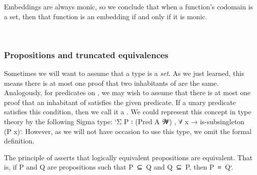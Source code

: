 Embeddings are always monic, so we conclude that when a function's codomain is a set, then that function is an embedding if and only if it is monic.
\ccpad
\begin{code}%
\>[0][@{}l@{\AgdaIndent{1}}]%
\>[1]\AgdaSpace{}%
\AgdaSymbol{:}%
\>[234I]\AgdaSymbol{(}\AgdaSpace{}%
\AgdaSymbol{:}\AgdaSpace{}%
\AgdaSpace{}%
\AgdaSpace{}%
\AgdaSymbol{)}\AgdaSpace{}%
\AgdaSpace{}%
\AgdaSpace{}%
\AgdaSpace{}%
\AgdaSpace{}%
\AgdaSpace{}%
\AgdaSpace{}%
\AgdaSpace{}%
\AgdaSpace{}%
\<%
\\
\>[1]\AgdaSpace{}%
\AgdaSpace{}%
\AgdaSpace{}%
\AgdaSymbol{=}\AgdaSpace{}%
\AgdaSymbol{(}\AgdaSpace{}%
\AgdaSymbol{)}\AgdaOperator{\AgdaInductiveConstructor{,}}\AgdaSpace{}%
\AgdaSymbol{(}\AgdaSpace{}%
\AgdaSpace{}%
\AgdaSymbol{)}\<%
\end{code}

\newcommand\proptype{\href{https://agda.readthedocs.io/en/v2.6.1.3/language/prop.html}{\af{Prop}}\xspace}

\subsubsection{Propositions and truncated equivalences}\label{propositions}

Sometimes we will want to assume that a type  is a \emph{set}. As we just learned, this means there is at most one proof that two inhabitants of  are the same. Analogously, for predicates on , we may wish to assume that there is at most one proof that an inhabitant of  satisfies the given predicate. If a unary predicate satisfies this condition, then we call it a . We could represent this concept in type theory by the following Sigma type: `Σ P ꞉ (Pred A 𝓦) , ∀ x → is-subsingleton (P x)`. However, as we will not have occasion to use this type, we omit the formal definition.

The principle of  asserts that logically equivalent propositions are equivalent.  That is, if \ab P and \ab Q are propositions such that \ab P~\af ⊆~\ab Q and \ab Q~\af ⊆~\ab P, then \ab P~\ad ≡~\ab Q`.

